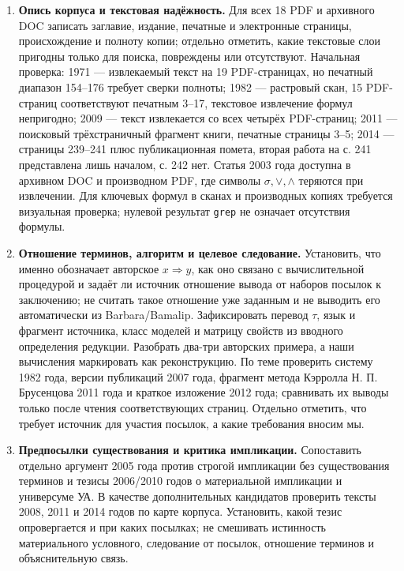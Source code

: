 \documentclass[12pt,a4paper]{article}
\begin{document}
\begin{enumerate}
\item \textbf{Опись корпуса и текстовая надёжность.} Для всех 18 PDF и архивного DOC записать заглавие, издание, печатные и электронные страницы, происхождение и полноту копии; отдельно отметить, какие текстовые слои пригодны только для поиска, повреждены или отсутствуют. Начальная проверка: 1971 — извлекаемый текст на 19 PDF-страницах, но печатный диапазон 154–176 требует сверки полноты; 1982 — растровый скан, 15 PDF-страниц соответствуют печатным 3–17, текстовое извлечение формул непригодно; 2009 — текст извлекается со всех четырёх PDF-страниц; 2011 — поисковый трёхстраничный фрагмент книги, печатные страницы 3–5; 2014 — страницы 239–241 плюс публикационная помета, вторая работа на с. 241 представлена лишь началом, с. 242 нет. Статья 2003 года доступна в архивном DOC и производном PDF, где символы \(\sigma,\lor,\land\) теряются при извлечении. Для ключевых формул в сканах и производных копиях требуется визуальная проверка; нулевой результат \texttt{grep} не означает отсутствия формулы.
\item \textbf{Отношение терминов, алгоритм и целевое следование.} Установить, что именно обозначает авторское \(x\Rightarrow y\), как оно связано с вычислительной процедурой и задаёт ли источник отношение вывода от наборов посылок к заключению; не считать такое отношение уже заданным и не выводить его автоматически из Barbara/Bamalip. Зафиксировать перевод \(\tau\), язык и фрагмент источника, класс моделей и матрицу свойств из вводного определения редукции. Разобрать два-три авторских примера, а наши вычисления маркировать как реконструкцию. По теме проверить систему 1982 года, версии публикаций 2007 года, фрагмент метода Кэрролла Н. П. Брусенцова 2011 года и краткое изложение 2012 года; сравнивать их выводы только после чтения соответствующих страниц. Отдельно отметить, что требует источник для участия посылок, а какие требования вносим мы.
\item \textbf{Предпосылки существования и критика импликации.} Сопоставить отдельно аргумент 2005 года против строгой импликации без существования терминов и тезисы 2006/2010 годов о материальной импликации и универсуме \(\text{УА}\). В качестве дополнительных кандидатов проверить тексты 2008, 2011 и 2014 годов по карте корпуса. Установить, какой тезис опровергается и при каких посылках; не смешивать истинность материального условного, следование от посылок, отношение терминов и объяснительную связь.

\end{enumerate}
\end{document}
